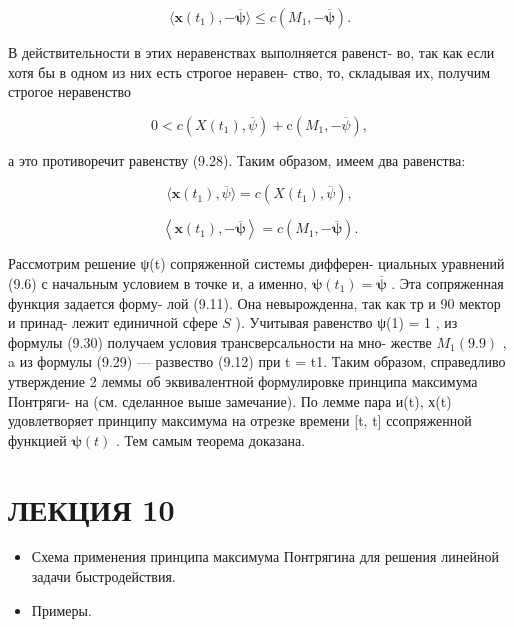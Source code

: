 \documentclass[8pt]{extarticle}
\begin{document}
\[
\langle \mathbf{x}\left( {t}_{1}\right) , - \overline{\mathbf{\psi }}\rangle  \leq  c\left( {{M}_{1}, - \overline{\mathbf{\psi }}}\right) .
\]

В действительности в этих неравенствах выполняется равенст- во, так как если хотя бы в одном из них есть строгое неравен- ство, то, складывая их, получим строгое неравенство

\[
0 < c\left( {X\left( {t}_{1}\right) ,\overline{\psi }}\right)  + \mathrm{c}\left( {{M}_{1}, - \overline{\psi }}\right) ,
\]

а это противоречит равенству (9.28). Таким образом, имеем два равенства:

\[
\langle \mathbf{x}\left( {t}_{1}\right) ,\overline{\psi }\rangle  = c\left( {X\left( {t}_{1}\right) ,\overline{\psi }}\right) , \tag{9.29}
\]

\[
\left\langle  {\mathbf{x}\left( {t}_{1}\right) , - \overline{\mathbf{\psi }}}\right\rangle   = c\left( {{M}_{1}, - \overline{\mathbf{\psi }}}\right) . \tag{9.30}
\]

Рассмотрим решение ψ(t) сопряженной системы дифферен- циальных уравнений (9.6) с начальным условием в точке и, а именно, \(\mathbf{\psi }\left( {t}_{1}\right)  = \overline{\mathbf{\psi }}\) . Эта сопряженная функция задается форму- лой (9.11). Она невырожденна, так как тр и 90 мектор и принад- лежит единичной сфере \(S\) ). Учитывая равенство ψ(1) = 1 , из формулы (9.30) получаем условия трансверсальности на мно- жестве \({M}_{1}\left( {9.9}\right)\) , a из формулы (9.29) — развество (9.12) при t = t1. Таким образом, справедливо утверждение 2 леммы об эквивалентной формулировке принципа максимума Понтряги- на (см. сделанное выше замечание). По лемме пара и(t), х(t) удовлетворяет принципу максимума на отрезке времени [t, t] ссопряженной функцией \(\mathbf{\psi }\left( t\right)\) . Тем самым теорема доказана.

\section*{ЛЕКЦИЯ 10}

\begin{itemize}\relax
\item\relax Схема применения принципа максимума Понтрягина для решения линейной задачи быстродействия.
\end{itemize}

\begin{itemize}\relax
\item\relax Примеры.
\end{itemize}
\end{document}
